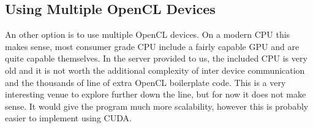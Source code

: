 \documentclass[final]{report}
\begin{document}
\subsection{Using Multiple OpenCL Devices}
An other option is to use multiple OpenCL devices.
On a modern CPU this makes sense, most consumer grade CPU include a fairly capable GPU and are quite capable themselves.
In the server provided to us, the included CPU is very old and it is not worth the additional complexity of inter device communication and the thousands of line of extra OpenCL boilerplate code.
This is a very interesting venue to explore further down the line, but for now it does not make sense.
It would give the program much more scalability, however this is probably easier to implement using CUDA.
\end{document}
